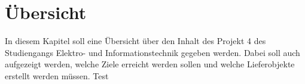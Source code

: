 	\clearpage
\section{Übersicht}\label{sec:Uebersicht}

In diesem Kapitel soll eine Übersicht über den Inhalt des Projekt 4 des Studiengangs Elektro- und Informationstechnik gegeben werden. Dabei soll auch aufgezeigt werden, welche Ziele erreicht werden sollen und welche Lieferobjekte erstellt werden müssen. Test

 








